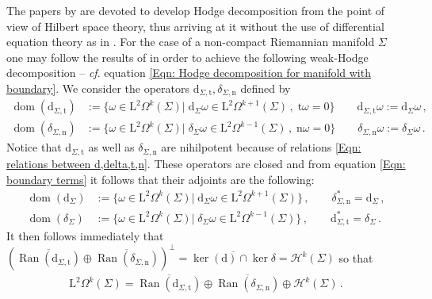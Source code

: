	The papers by \cite{Axelsson-McIntosh-04,Gaffney-55} are devoted to develop Hodge decomposition from the point of view of Hilbert space theory, thus arriving at it without the use of differential equation theory as in \cite{Schwarz-95}. For the case of a non-compact Riemannian manifold $\Sigma$ one may follow the results of \cite{Axelsson-McIntosh-04} in order to achieve the following weak-Hodge decomposition -- \textit{cf}. equation \eqref{Eqn: Hodge decomposition for manifold with boundary}.
	We consider the operators $\mathrm{d}_{\Sigma,\mathrm{t}},\delta_{\Sigma,\mathrm{n}}$ defined by
	\begin{align}
		\label{Eqn: Dirichlet differential}
		\operatorname{dom}(\mathrm{d}_{\Sigma,\mathrm{t}})&:=\lbrace
		\omega\in\mathrm{L}^2\Omega^k(\Sigma)|\;\mathrm{d}_\Sigma\omega\in\mathrm{L}^2\Omega^{k+1}(\Sigma)\,,\;\mathrm{t}\omega=0\rbrace\qquad
		\mathrm{d}_{\Sigma,\mathrm{t}}\omega:=\mathrm{d}_\Sigma\omega\,,\\
		\label{Eqn: Neumann codifferential}
		\operatorname{dom}(\delta_{\Sigma,\mathrm{n}})&:=\lbrace
		\omega\in\mathrm{L}^2\Omega^k(\Sigma)|\;\delta_\Sigma\omega\in\mathrm{L}^2\Omega^{k-1}(\Sigma)\,,\;\mathrm{n}\omega=0\rbrace\qquad
		\delta_{\Sigma,\mathrm{n}}\omega:=\delta_\Sigma\omega\,.
	\end{align}
	Notice that $\mathrm{d}_{\Sigma,\mathrm{t}}$ as well as $\delta_{\Sigma,\mathrm{n}}$ are nihilpotent because of relations \eqref{Eqn: relations between d,delta,t,n}.
	These operators are closed and from equation \eqref{Eqn: boundary terms} it follows that their adjoints are the following:
	\begin{align*}
		\operatorname{dom}(\mathrm{d}_\Sigma)&:=\lbrace
		\omega\in\mathrm{L}^2\Omega^k(\Sigma)|\;\mathrm{d}_\Sigma\omega\in\mathrm{L}^2\Omega^{k+1}(\Sigma)\rbrace\,,\qquad
		\delta_{\Sigma,\mathrm{n}}^*=\mathrm{d}_\Sigma\,,\\
		\operatorname{dom}(\delta_\Sigma)&:=\lbrace
		\omega\in\mathrm{L}^2\Omega^k(\Sigma)|\;\delta_\Sigma\omega\in\mathrm{L}^2\Omega^{k-1}(\Sigma)\rbrace\,,\qquad
		\mathrm{d}_{\Sigma,\mathrm{t}}^*=\delta_\Sigma\,.
	\end{align*}
	It then follows immediately that $(\overline{\operatorname{Ran}(\mathrm{d}_{\Sigma,\mathrm{t}})}\oplus\overline{\operatorname{Ran}(\delta_{\Sigma,\mathrm{n}})})^\perp=\overline{\ker(\mathrm{d})\cap\ker\delta}=\mathcal{H}^k(\Sigma)$ so that
	\begin{align}\label{Eqn: weak-Hodge decomposition for boundary}
		\mathrm{L}^2\Omega^k(\Sigma)=
		\overline{\operatorname{Ran}(\mathrm{d}_{\Sigma,\mathrm{t}})}\oplus
		\overline{\operatorname{Ran}(\delta_{\Sigma,\mathrm{n}})}\oplus
		\mathcal{H}^k(\Sigma)\,.
	\end{align}

